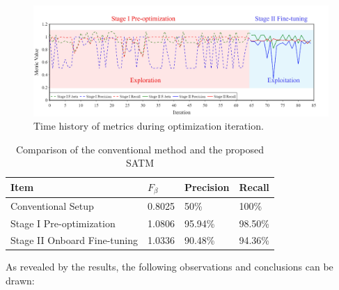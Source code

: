 \documentclass[a4paper,fleqn,numbers,sort&compress]{cas-sc}
\begin{document}
\begin{figure}[htbp]
    \centering
    \includegraphics[width=\linewidth]{Fig16.jpg}
    \caption{Time history of metrics during optimization iteration.}
    \label{fig:Metric History}
\end{figure}

\begin{table}[h!]
    \centering
    \caption{Comparison of the conventional method and the proposed SATM}
    \label{tab:comparison}
    \renewcommand{\arraystretch}{1.5}
    {\selectfont %
    \small
    \begin{tabular}{|p{}|p{}|p{}|p{}|}
    \hline
    \textbf{Item}  & \textbf{$F_{\beta}$}  & \textbf{Precision} & \textbf{Recall}\\ \hline
    Conventional Setup & 0.8025 & 50\% & 100\% \\ \hline
    Stage I Pre-optimization & 1.0806 & 95.94\% & 98.50\% \\ \hline
    Stage II Onboard Fine-tuning & 1.0336 & 90.48\% & 94.36\% \\ \hline
    \end{tabular}
    } %
\end{table}

As revealed by the results, the following observations and conclusions can be drawn:
\end{document}
